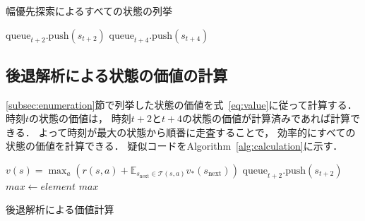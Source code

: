 \begin{algorithm}[tb]
\caption{幅優先探索によるすべての状態の列挙}
\label{alg:bfs}
\begin{algorithmic}[1]
                \State $\text{queue}_{t+2}.\text{push}(s_{t+2})$
            \EndFor
                \State $\text{queue}_{t+4}.\text{push}(s_{t+4})$
            \EndFor
        \EndFor
    \EndFor
\EndFunction
\end{algorithmic}
\end{algorithm}

\subsection{後退解析による状態の価値の計算}
\label{subsec:calculation}
\ref{subsec:enumeration}節で列挙した状態の価値を式~\ref{eq:value}に従って計算する．
時刻$t$の状態の価値は， 時刻$t+2$と$t+4$の状態の価値が計算済みであれば計算できる．
よって時刻が最大の状態から順番に走査することで， 効率的にすべての状態の価値を計算できる．
疑似コードをAlgorithm~\ref{alg:calculation}に示す．

\begin{algorithm}[tb]
    \begin{algorithmic}[1]

            \State $v(s) = \max_a \left(r(s,a) + \mathbb{E}_{s_\text{next} \in \mathcal{T}(s,a)} v_*(s_\text{next}) \right)$
        \EndFor
                \State $\text{queue}_{t+2}.\text{push}(s_{t+2})$
            \EndFor
                \State $max \gets element$
            \EndIf
        \EndFor
        \State \Return $max$
    \EndFunction
    \end{algorithmic}
    \caption{後退解析による価値計算}
    \label{alg:calculation}
\end{algorithm}

